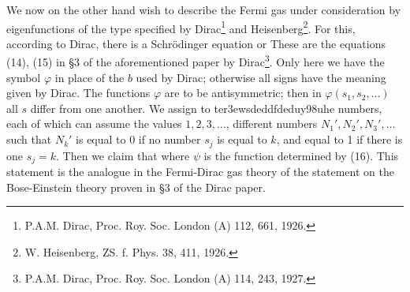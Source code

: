 \begin{paper}{1}
We now on the other hand wish to describe the Fermi gas under consideration by eigenfunctions of the type specified by Dirac\footnote{P.A.M. Dirac, Proc. Roy. Soc. London (A) 112, 661, 1926.} and Heisenberg\footnote{W. Heisenberg, ZS. f. Phys. 38, 411, 1926.}. For this, according to Dirac, there is a Schrödinger equation
or
These are the equations (14), (15) in \S3 of the aforementioned paper by Dirac\footnote{P.A.M. Dirac, Proc. Roy. Soc. London (A) 114, 243, 1927.}. Only here we have the symbol $\varphi$ in place of the $b$ used by Dirac; otherwise all signs have the meaning given by Dirac. The functions $\varphi$ are to be antisymmetric; then in $\varphi(s_1,s_2,\dots)$ all $s$ differ from one another. We assign to ter3ewsdeddfdeduy98uhe numbers, each of which can assume the values $1,2,3,\dots$, different numbers $N_1',N_2',N_3',\dots$ such that $N_k'$ is equal to 0 if no number $s_j$ is equal to $k$, and equal to 1 if there is one $s_j=k$. Then we claim that
where $\psi$ is the function determined by (16). This statement is the analogue in the Fermi-Dirac gas theory of the statement on the Bose-Einstein theory proven in \S3 of the Dirac paper.


\end{paper}
